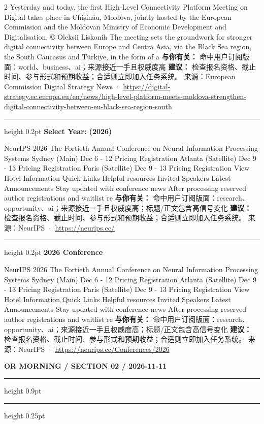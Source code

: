 \documentclass[10.5pt]{ctexart}
\begin{document}
\begin{multicols}{2}
Yesterday and today, the first High-Level Connectivity Platform Meeting on Digital takes place in Chișinău, Moldova, jointly hosted by the European Commission and the Moldovan Ministry of Economic Development and Digitalisation. © Oleksii Liskonih The meeting sets the groundwork for stronger digital connectivity between Europe and Centra Asia, via the Black Sea region, the South Caucasus and Türkiye, in the form of a
\textbf{与你有关：} 命中用户订阅版面：world、business、ai；来源接近一手且权威度高
\textbf{建议：} 检查报名资格、截止时间、参与形式和预期收益；合适则立即加入任务系统。
{\footnotesize\color{ormuted} 来源：European Commission Digital Strategy News · \url{https://digital-strategy.ec.europa.eu/en/news/high-level-platform-meets-moldova-strengthen-digital-connectivity-between-eu-black-sea-region-south}}
\vspace{2mm}
\hrule height 0.2pt
\vspace{2mm}
{\large\bfseries Select Year: (2026)}\par
NeurIPS 2026 The Fortieth Annual Conference on Neural Information Processing Systems Sydney (Main) Dec 6 - 12 Pricing Registration Atlanta (Satellite) Dec 9 - 13 Pricing Registration Paris (Satellite) Dec 9 - 13 Pricing Registration View Hotel Information Quick Links Helpful resources Invited Speakers Latest Announcements Stay updated with conference news After processing reserved author registrations and waitlist re
\textbf{与你有关：} 命中用户订阅版面：research、opportunity、ai；来源接近一手且权威度高；标题/正文包含高信号变化
\textbf{建议：} 检查报名资格、截止时间、参与形式和预期收益；合适则立即加入任务系统。
{\footnotesize\color{ormuted} 来源：NeurIPS · \url{https://neurips.cc/}}
\vspace{2mm}
\hrule height 0.2pt
\vspace{2mm}
{\large\bfseries 2026 Conference}\par
NeurIPS 2026 The Fortieth Annual Conference on Neural Information Processing Systems Sydney (Main) Dec 6 - 12 Pricing Registration Atlanta (Satellite) Dec 9 - 13 Pricing Registration Paris (Satellite) Dec 9 - 13 Pricing Registration View Hotel Information Quick Links Helpful resources Invited Speakers Latest Announcements Stay updated with conference news After processing reserved author registrations and waitlist re
\textbf{与你有关：} 命中用户订阅版面：research、opportunity、ai；来源接近一手且权威度高；标题/正文包含高信号变化
\textbf{建议：} 检查报名资格、截止时间、参与形式和预期收益；合适则立即加入任务系统。
{\footnotesize\color{ormuted} 来源：NeurIPS · \url{https://neurips.cc/Conferences/2026}}
\end{multicols}
\newpage
{\small\bfseries OR MORNING / SECTION 02 / 2026-11-11}
\vspace{2mm}
\hrule height 0.9pt
\vspace{1.5mm}
\hrule height 0.25pt
\vspace{4mm}
\end{document}
